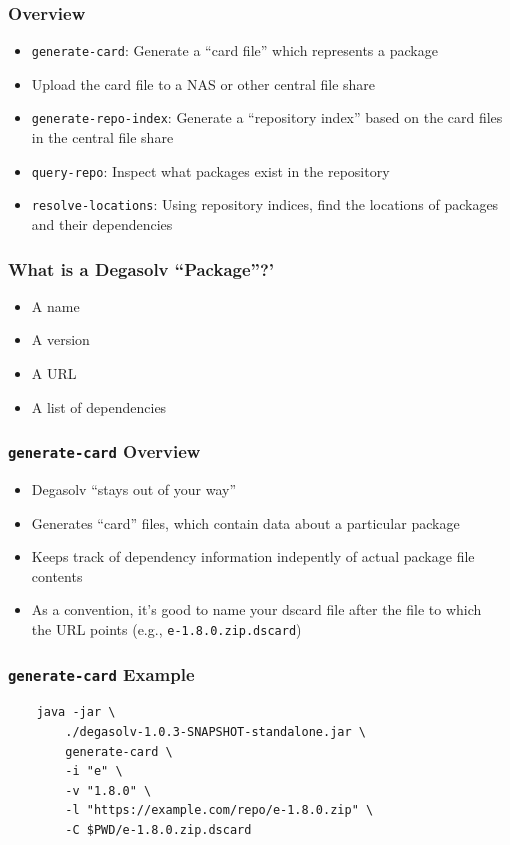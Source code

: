 \documentclass{beamer}
\begin{document}
\begin{frame}
  \frametitle{Overview}
  \begin{itemize}
  \item \texttt{generate-card}: Generate a ``card file'' which represents a package
  \item Upload the card file to a NAS or other central file share
  \item \texttt{generate-repo-index}: Generate a ``repository index'' based on the card files
    in the central file share
  \item \texttt{query-repo}: Inspect what packages exist in the repository
  \item \texttt{resolve-locations}: Using repository indices, find the locations
    of packages and their dependencies
  \end{itemize}
\end{frame}
\begin{frame}
  \frametitle{What is a Degasolv ``Package''?'}
  \begin{itemize}
  \item A name
  \item A version
  \item A URL
  \item A list of dependencies
  \end{itemize}
\end{frame}
\begin{frame}
  \frametitle{\texttt{generate-card} Overview}
  \begin{itemize}
  \item Degasolv ``stays out of your way''
  \item Generates ``card'' files, which contain data about a particular package
  \item Keeps track of dependency information indepently of actual package file contents
  \item As a convention, it's good to name your dscard file after the file to which \\
    the URL points (e.g., \texttt{e-1.8.0.zip.dscard})
  \end{itemize}
\end{frame}
\begin{frame}[fragile]
  \frametitle{\texttt{generate-card} Example}
\begin{verbatim}
    java -jar \
        ./degasolv-1.0.3-SNAPSHOT-standalone.jar \
        generate-card \
        -i "e" \
        -v "1.8.0" \
        -l "https://example.com/repo/e-1.8.0.zip" \
        -C $PWD/e-1.8.0.zip.dscard
\end{verbatim}
\end{frame}
\end{document}
